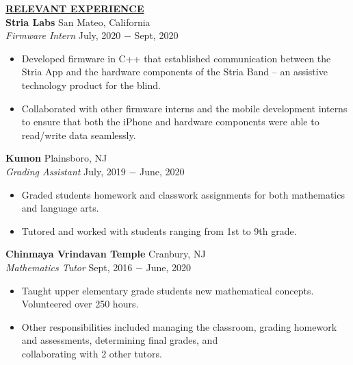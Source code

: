 \documentclass{article}
\begin{document}
% 
%
\noindent \textbf{\underline{RELEVANT EXPERIENCE}} \\
\noindent \textbf{Stria Labs} \hfill San Mateo, California \\
\textit{Firmware Intern} \hfill July, 2020 $-$ Sept, 2020
\begin{itemize}[noitemsep,nolistsep,leftmargin=*]
\item {Developed firmware in C++ that established communication between the Stria App and the hardware components of the Stria Band -- an assistive technology product for the blind.}
\item {Collaborated with other firmware interns and the mobile development interns to ensure that both the iPhone and hardware components were able to read/write data seamlessly.\\}
\end{itemize}

\noindent \textbf{Kumon} \hfill Plainsboro, NJ \\
\textit{Grading Assistant} \hfill July, 2019 $-$ June, 2020
\begin{itemize}[noitemsep,nolistsep,leftmargin=*]
\item {Graded students homework and classwork assignments for both mathematics and language arts.}
\item {Tutored and worked with students ranging from 1st to 9th grade.}\\
\end{itemize}

\noindent \textbf{Chinmaya Vrindavan Temple} \hfill Cranbury, NJ \\
\textit{Mathematics Tutor} \hfill Sept, 2016 $-$ June, 2020
\begin{itemize}[noitemsep,nolistsep,leftmargin=*]
\item {Taught upper elementary grade students new mathematical concepts. Volunteered over 250 hours.}
\item {Other responsibilities included managing the classroom, grading homework and assessments, determining final grades, and}\\{collaborating with 2 other tutors.}\\
\end{itemize}
\end{document}
